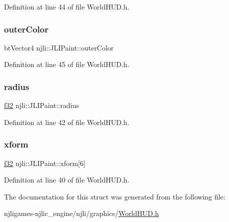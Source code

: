 Definition at line 44 of file World\+H\+U\+D.\+h.

\mbox{\label{structnjli_1_1_j_l_i_paint_a1503a9e8b210e51f305939d54eb57e3f}} 
\subsubsection{\texorpdfstring{outer\+Color}{outerColor}}
{\footnotesize\ttfamily bt\+Vector4 njli\+::\+J\+L\+I\+Paint\+::outer\+Color}



Definition at line 45 of file World\+H\+U\+D.\+h.

\mbox{\label{structnjli_1_1_j_l_i_paint_a7496627a07e930c0f224b7bdab820924}} 
\subsubsection{\texorpdfstring{radius}{radius}}
{\footnotesize\ttfamily \mbox{\hyperlink{_util_8h_a5f6906312a689f27d70e9d086649d3fd}{f32}} njli\+::\+J\+L\+I\+Paint\+::radius}



Definition at line 42 of file World\+H\+U\+D.\+h.

\mbox{\label{structnjli_1_1_j_l_i_paint_ace4bc2627435f8b885026d397371bab0}} 
\subsubsection{\texorpdfstring{xform}{xform}}
{\footnotesize\ttfamily \mbox{\hyperlink{_util_8h_a5f6906312a689f27d70e9d086649d3fd}{f32}} njli\+::\+J\+L\+I\+Paint\+::xform\mbox{[}6\mbox{]}}



Definition at line 40 of file World\+H\+U\+D.\+h.



The documentation for this struct was generated from the following file\+:\begin{DoxyCompactItemize}
\item 
njligames-\/njlic\+\_\+engine/njli/graphics/\mbox{\hyperlink{_world_h_u_d_8h}{World\+H\+U\+D.\+h}}\end{DoxyCompactItemize}

